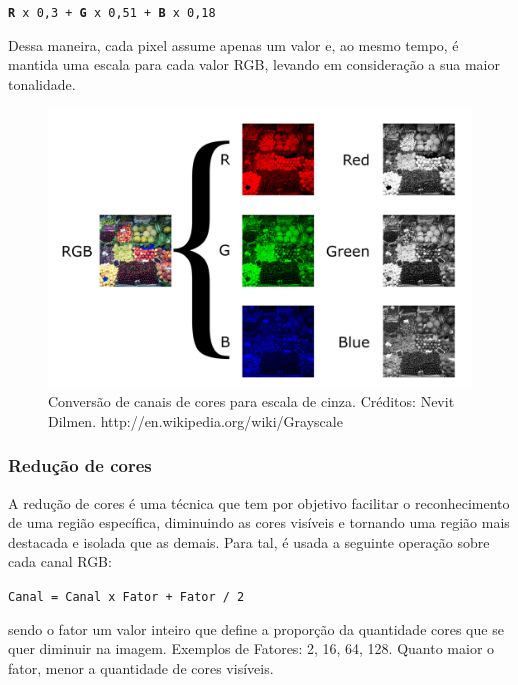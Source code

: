 \documentclass[12pt]{article}
\begin{document}
\texttt{\small \textbf{R} x 0,3 + \textbf{G} x 0,51 + \textbf{B} x 0,18}

\noindent Dessa maneira, cada pixel assume apenas um valor e, ao mesmo tempo, \'e mantida uma escala para cada valor RGB,
levando em considera\c c\~ao a sua maior tonalidade.

	\begin{figure}[ht!]
	\begin{center}
		\includegraphics[scale=0.8]{img/1200px-Beyoglu_4671_tricolor.png}
		\footnotesize \caption{Convers\~ao de canais de cores para escala de cinza. Cr\'editos: Nevit Dilmen. http://en.wikipedia.org/wiki/Grayscale }
	\end{center}
	\end{figure}	

\subsubsection{Redu\c c\~ao de cores}
A redu\c c\~ao de cores \'e uma t\'ecnica que tem por objetivo facilitar o reconhecimento de uma regi\~ao espec\'ifica,
diminuindo as cores vis\'iveis e tornando uma regi\~ao mais destacada e isolada que as demais.
Para tal, \'e usada a seguinte opera\c c\~ao sobre cada canal RGB:

\texttt{\small Canal = Canal x Fator + Fator / 2}

\noindent sendo o fator um valor inteiro que define a propor\c c\~ao da quantidade cores que se quer diminuir na imagem.
Exemplos de Fatores: 2, 16, 64, 128. Quanto maior o fator, menor a quantidade de cores vis\'iveis.
\end{document}
